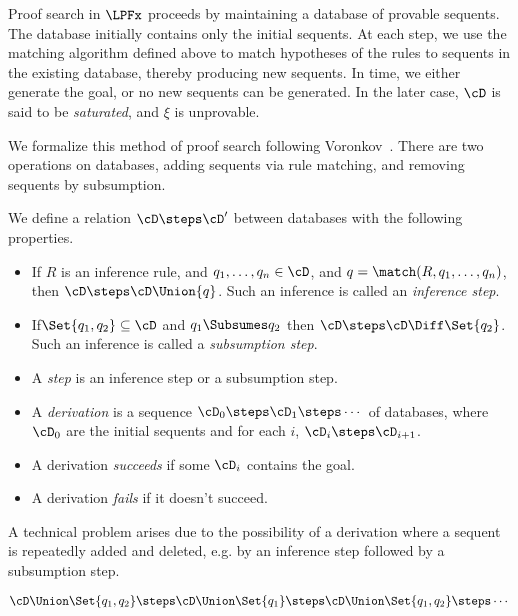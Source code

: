 \noindent
Proof search in $\LPFx$ proceeds by
maintaining a database of provable sequents.  The database initially contains
only the initial sequents.  At each step, we use the matching
algorithm defined above to match hypotheses of the rules to sequents
in the existing database, thereby producing new sequents.  In time, we either generate
the goal, or no new sequents can be generated.  In the later case, $\cD$ is said
to be \emph{saturated}, and $\xi$ is unprovable.

We formalize this method of proof search following Voronkov~\cite[Section
7.4]{Voronkov.2001.Handbook}.  There are two operations on databases, adding
sequents via rule matching, and removing sequents by subsumption.

\begin{definition}
  We define a relation $\cD\steps\cD'$ between databases with the following
  properties.
  \begin{itemize}
  \item If $R$ is an inference rule,
    and $q_1, \ldots, q_n\in\cD$, and $q = \match(R, q_1,\ldots, q_n)$, then
    $\cD\steps\cD\Union{q}$.  Such an inference is called an
    \emph{inference step}.

  \item If$\Set{q_1,q_2}\subseteq\cD$ and  $q_1\Subsumes q_2$
    then $\cD\steps\cD\Diff\Set{q_2}$.
    Such an inference is called a \emph{subsumption step}.

  \item A \emph{step} is an inference step or a subsumption step.

  \item A \emph{derivation} is a sequence $\cD_0\steps\cD_1\steps\cdots$
    of databases, where $\cD_0$
    are the initial sequents and for each $i$, $\cD_i\steps\cD_{i+1}$.

  \item A derivation \emph{succeeds} if some $\cD_i$ contains the goal.
  \item A derivation \emph{fails} if it doesn't succeed.
  \end{itemize}
\end{definition}

\noindent
A technical problem arises due to the possibility of a derivation where
a sequent is repeatedly added and deleted, e.g. by an inference step followed
by a subsumption step.

\[
\cD\Union\Set{q_1,q_2}\steps\cD\Union\Set{q_1}\steps\cD\Union\Set{q_1,q_2}\steps\cdots
\]

